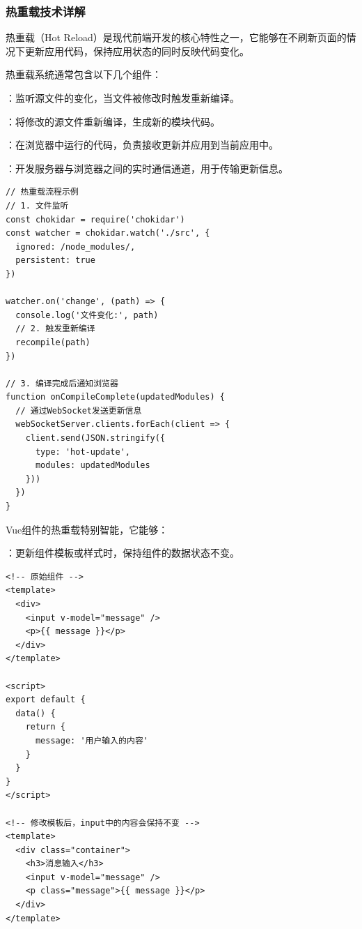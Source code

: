 \hypertarget{ux70edux91cdux8f7dux6280ux672fux8be6ux89e3}{%
\subsubsection{热重载技术详解}\label{ux70edux91cdux8f7dux6280ux672fux8be6ux89e3}}

热重载（Hot Reload）是现代前端开发的核心特性之一，它能够在不刷新页面的情况下更新应用代码，保持应用状态的同时反映代码变化。


热重载系统通常包含以下几个组件：

：监听源文件的变化，当文件被修改时触发重新编译。

：将修改的源文件重新编译，生成新的模块代码。

：在浏览器中运行的代码，负责接收更新并应用到当前应用中。

：开发服务器与浏览器之间的实时通信通道，用于传输更新信息。

\begin{lstlisting}[style=javascript]
// 热重载流程示例
// 1. 文件监听
const chokidar = require('chokidar')
const watcher = chokidar.watch('./src', {
  ignored: /node_modules/,
  persistent: true
})

watcher.on('change', (path) => {
  console.log('文件变化:', path)
  // 2. 触发重新编译
  recompile(path)
})

// 3. 编译完成后通知浏览器
function onCompileComplete(updatedModules) {
  // 通过WebSocket发送更新信息
  webSocketServer.clients.forEach(client => {
    client.send(JSON.stringify({
      type: 'hot-update',
      modules: updatedModules
    }))
  })
}
\end{lstlisting}


Vue组件的热重载特别智能，它能够：

：更新组件模板或样式时，保持组件的数据状态不变。

\begin{lstlisting}
<!-- 原始组件 -->
<template>
  <div>
    <input v-model="message" />
    <p>{{ message }}</p>
  </div>
</template>

<script>
export default {
  data() {
    return {
      message: '用户输入的内容'
    }
  }
}
</script>

<!-- 修改模板后，input中的内容会保持不变 -->
<template>
  <div class="container">
    <h3>消息输入</h3>
    <input v-model="message" />
    <p class="message">{{ message }}</p>
  </div>
</template>
\end{lstlisting}

